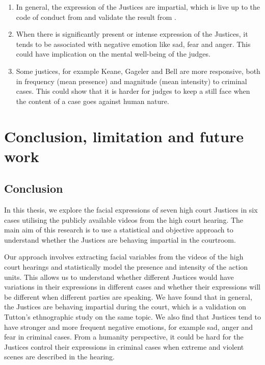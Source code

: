 \documentclass{monashthesis}
\begin{document}
\begin{enumerate}
\def\labelenumi{\arabic{enumi})}
\item
  In general, the expression of the Justices are impartial, which is live up to the code of conduct from \textcite{judicalguid} and validate the result from \textcite{tutton2018judicial}.
\item
  When there is significantly present or intense expression of the Justices, it tends to be associated with negative emotion like sad, fear and anger. This could have implication on the mental well-being of the judges.
\item
  Some justices, for example Keane, Gageler and Bell are more responsive, both in frequency (mean presence) and magnitude (mean intensity) to criminal cases. This could show that it is harder for judges to keep a still face when the content of a case goes against human nature.
\end{enumerate}

\hypertarget{conclusion-limitation-and-future-work}{%
\chapter{Conclusion, limitation and future work}\label{conclusion-limitation-and-future-work}}

\hypertarget{conclusion}{%
\section{Conclusion}\label{conclusion}}

In this thesis, we explore the facial expressions of seven high court Justices in six cases utilising the publicly available videos from the high court hearing. The main aim of this research is to use a statistical and objective approach to understand whether the Justices are behaving impartial in the courtroom.

Our approach involves extracting facial variables from the videos of the high court hearings and statistically model the presence and intensity of the action units. This allows us to understand whether different Justices would have variations in their expressions in different cases and whether their expressions will be different when different parties are speaking. We have found that in general, the Justices are behaving impartial during the court, which is a validation on Tutton's ethnographic study on the same topic. We also find that Justices tend to have stronger and more frequent negative emotions, for example sad, anger and fear in criminal cases. From a humanity perspective, it could be hard for the Justices control their expressions in criminal cases when extreme and violent scenes are described in the hearing.
\end{document}
